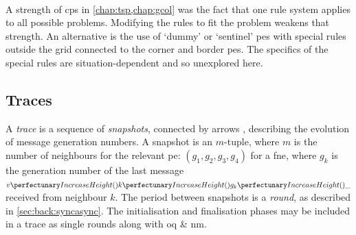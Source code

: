 \begin{cprulesetfloat}
    \begin{cpruleset}
        
        \\
        
        
    \end{cpruleset}
    \caption[Alternative forms of \cref{ruleset:nmp:proxspec}'s rule 3]{\label{ruleset:nmp:3alts}Alternative forms of \cref{ruleset:nmp:proxspec}'s  for \glspl{pe} on the border of a grid or in the corner of a grid, respectively}
\end{cprulesetfloat}

A strength of \gls{cps} in \cref{chap:tsp,chap:gcol} was the fact that one rule system applies to all possible problems.  Modifying the rules to fit the problem weakens that strength.  An alternative is the use of `dummy' or `sentinel' \glspl{pe} with special rules outside the grid connected to the corner and border \glspl{pe}.  The specifics of the special rules are situation-dependent and so unexplored here.

\subsection{Traces}

A \emph{trace} is a sequence of \emph{snapshots}, connected by arrows \tarr{}, describing the evolution of message generation numbers. A snapshot is an \(m\)-tuple, where \(m\) is the number of neighbours for the relevant \gls{pe}:  \((g_1, g_2, g_3, g_4)\) for a \gls{fne}, where \(g_k\) is the generation number of the last message \(\cpvv{k}{g_k}{\cpdiscard}\) received from neighbour \(k\).  The period between snapshots is a \emph{round}, as described in \cref{sec:back:syncasync}.  The initialisation and finalisation phases may be included in a trace as single rounds along with \gls{oq} \& \gls{nm}.

